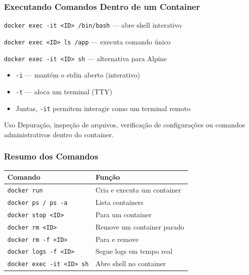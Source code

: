 \begin{frame}
  \frametitle{Executando Comandos Dentro de um Container}
  \texttt{docker exec -it <ID> /bin/bash} — abre shell interativo

  \vspace{0.3em}
  \texttt{docker exec <ID> ls /app} \hspace{1em} — executa comando único

  \vspace{0.3em}
  \texttt{docker exec -it <ID> sh} \hspace{1.5em} — alternativa para Alpine

  \vspace{0.8em}
  \begin{itemize}
    \item \texttt{-i} — mantém o stdin aberto (interativo)
    \item \texttt{-t} — aloca um terminal (TTY)
    \item Juntas, \texttt{-it} permitem interagir como um terminal remoto
  \end{itemize}

  \vspace{0.5em}
  \begin{block}{Uso}
    Depuração, inspeção de arquivos, verificação de configurações ou
    comandos administrativos dentro do container.
  \end{block}
\end{frame}

\begin{frame}
  \frametitle{Resumo dos Comandos}
  \begin{center}
  \small
  \begin{tabular}{|l|l|}
  \hline
  \textbf{Comando} & \textbf{Função} \\
  \hline
  \texttt{docker run} & Cria e executa um container \\
  \texttt{docker ps / ps -a} & Lista containers \\
  \texttt{docker stop <ID>} & Para um container \\
  \texttt{docker rm <ID>} & Remove um container parado \\
  \texttt{docker rm -f <ID>} & Para e remove \\
  \texttt{docker logs -f <ID>} & Segue logs em tempo real \\
  \texttt{docker exec -it <ID> sh} & Abre shell no container \\
  \hline
  \end{tabular}
  \end{center}
\end{frame}
